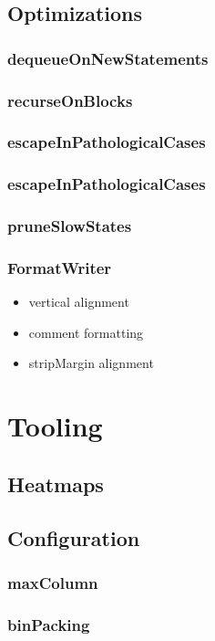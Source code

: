 \documentclass[11pt,a4paper]{article}
\begin{document}
\subsection{Optimizations}
\subsubsection{dequeueOnNewStatements}
\subsubsection{recurseOnBlocks}
\subsubsection{escapeInPathologicalCases}
\subsubsection{escapeInPathologicalCases}
\subsubsection{pruneSlowStates}
\subsubsection{FormatWriter}
\begin{itemize}
  \item vertical alignment
  \item comment formatting
  \item stripMargin alignment
\end{itemize}
\section{Tooling}\label{sec:tooling}
\subsection{Heatmaps}
\subsection{Configuration}
\subsubsection{maxColumn}
\subsubsection{binPacking}
\end{document}
